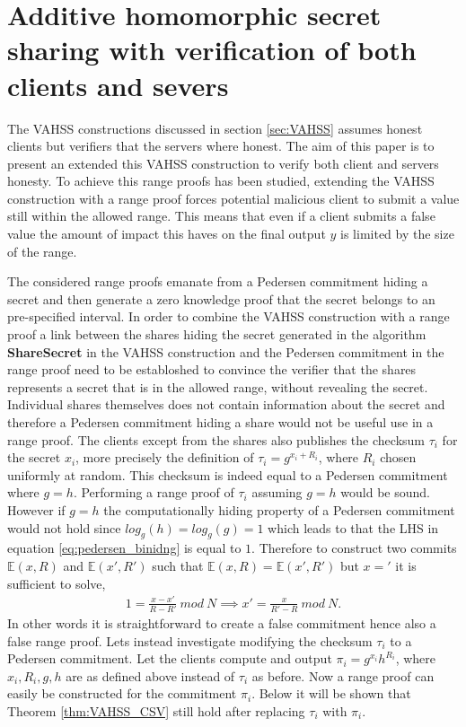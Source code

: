 \section{Additive homomorphic secret sharing with verification of both clients and severs }
\label{sec:combination}

The  VAHSS constructions  discussed in section \ref{sec:VAHSS} assumes honest clients but verifiers that the servers where honest. The aim of this paper is to present an extended this VAHSS construction to verify both client and servers honesty.  To achieve this range proofs has been studied, extending the VAHSS construction with a range proof  forces potential malicious client to submit a value still within the allowed range. This means that even if a client submits a false value the amount of impact this haves on the final output $y$ is limited by the size of the range.

The considered range proofs emanate from a Pedersen commitment hiding a secret and then generate a zero knowledge proof that the secret belongs to an pre-specified interval. In order to combine the VAHSS construction with a range proof a link between the shares hiding the secret generated in the algorithm \textbf{ShareSecret} in the VAHSS construction and  the Pedersen commitment in the range proof need to be establoshed to convince the verifier that the shares  represents a secret that is in the allowed range, without revealing the secret. Individual shares themselves does not contain information about the secret and therefore a Pedersen commitment hiding a share would not be useful use in a range proof. The clients except from the shares also publishes the checksum $\tau_i$ for the secret $x_i$, more precisely the definition of $\tau_i=g^{x_i+R_i}$, where $R_i$ chosen uniformly at random. This checksum is indeed equal to a Pedersen commitment where $g=h$. Performing a range proof of $\tau_i$ assuming $g=h$ would be sound. However if $g=h$ the computationally hiding property of a Pedersen commitment would not hold since $log_g(h)=log_g(g)=1$ which leads to that the LHS in equation \eqref{eq:pedersen_binidng} is equal to $1$. Therefore to construct two commits $\mathds{E}(x,R)$ and $\mathds{E}(x',R')$ such that $\mathds{E}(x,R) = \mathds{E}(x',R')$ but $x='$ it is sufficient to solve, 
\begin{align*}
1 = \frac{x-x'}{R-R'}\:mod \:N \implies x' = \frac{x}{R'-R} \:mod\: N.
\end{align*}
In other words it is straightforward to create a false commitment hence also a false range proof. Lets instead investigate modifying the checksum $\tau_i$ to a Pedersen commitment. Let the clients compute and output $\pi_i=g^{x_i}h^{R_i}$, where $x_i,R_i,g,h$ are as defined above instead of $\tau_i$ as before.  Now a range proof can easily be constructed for the commitment $\pi_i$. Below it will be shown that Theorem \ref{thm:VAHSS_CSV} still hold after replacing $\tau_i$ with $\pi_i$. 

